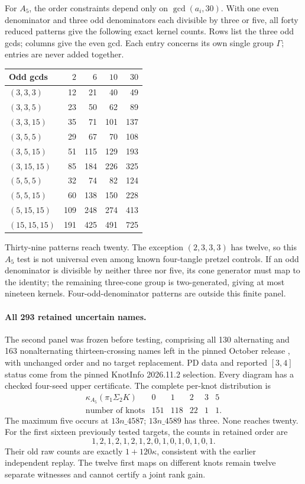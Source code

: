\documentclass[11pt]{article}
\begin{document}
For $A_5$, the order constraints depend only on
$\gcd(a_i,30)$. With one even denominator and three odd denominators
each divisible by three or five, all forty reduced patterns give
the following exact kernel counts. Rows list the three odd gcds;
columns give the even gcd. Each entry concerns its own single group
$\Gamma$; entries are never added together.
\begin{center}
\begin{tabular}{lrrrr}
\toprule
Odd gcds & $2$ & $6$ & $10$ & $30$\\
\midrule
$(3,3,3)$&12&21&40&49\\
$(3,3,5)$&23&50&62&89\\
$(3,3,15)$&35&71&101&137\\
$(3,5,5)$&29&67&70&108\\
$(3,5,15)$&51&115&129&193\\
$(3,15,15)$&85&184&226&325\\
$(5,5,5)$&32&74&82&124\\
$(5,5,15)$&60&138&150&228\\
$(5,15,15)$&109&248&274&413\\
$(15,15,15)$&191&425&491&725\\
\bottomrule
\end{tabular}
\end{center}
Thirty-nine patterns reach twenty. The exception $(2,3,3,3)$ has
twelve, so this $A_5$ test is not universal even among known
four-tangle pretzel controls. If an odd denominator is divisible by
neither three nor five, its cone generator must map to the identity;
the remaining three-cone group is two-generated, giving at most
nineteen kernels. Four-odd-denominator patterns are outside this
finite panel.

\paragraph{All 293 retained uncertain names.}
The second panel was frozen before testing, comprising all 130
alternating and 163 nonalternating thirteen-crossing names left in the
pinned October release \cite{deposit}, with unchanged order and no
target replacement. PD data and reported $[3,4]$ status come from the
pinned KnotInfo 2026.11.2 selection. Every diagram has a checked
four-seed upper certificate. The complete per-knot distribution is
\[
\begin{array}{c|rrrrr}
 \kappa_{A_5}(\pi_1\Sigma_2K)&0&1&2&3&5\\\hline
 \text{number of knots}&151&118&22&1&1.
\end{array}
\]
The maximum five occurs at $13n\_4587$; $13n\_4589$ has three.
None reaches twenty. For the first sixteen previously tested targets,
the counts in retained order are
\[
 1,2,1,2,1,2,1,2,0,1,0,1,0,1,0,1.
\]
Their old raw counts are exactly $1+120\kappa$, consistent with the
earlier independent replay. The twelve first maps on different knots
remain twelve separate witnesses and cannot certify a joint rank gain.
\end{document}
